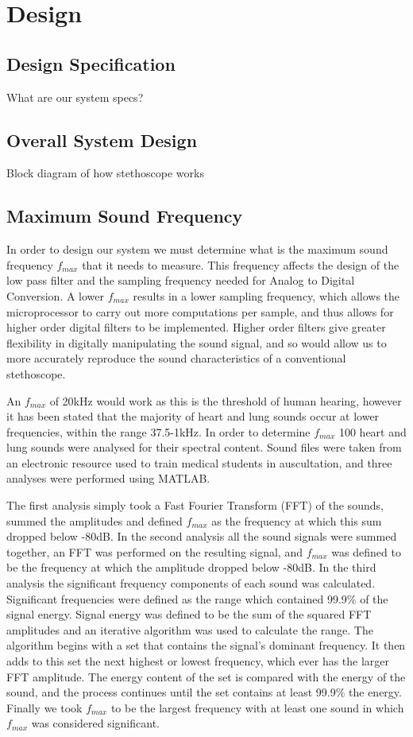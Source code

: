 \chapter{Design} \label{design}

\section{Design Specification}
What are our system specs?

\section{Overall System Design}
Block diagram of how stethoscope works

\section{Maximum Sound Frequency}
In order to design our system we must determine what is the maximum sound frequency $f_{max}$ that it needs to measure. This frequency affects the design of the low pass filter and the sampling frequency needed for Analog to Digital Conversion. A lower $f_{max}$ results in a lower sampling frequency, which allows the microprocessor to carry out more computations per sample, and thus allows for higher order digital filters to be implemented. Higher order filters give greater flexibility in digitally manipulating the sound signal, and so would allow us to more accurately reproduce the sound characteristics of a conventional stethoscope.

An $f_{max}$ of 20kHz would work as this is the threshold of human hearing\cite[p.~163]{Stuart2011}, however it has been stated that the majority of heart and lung sounds occur at lower frequencies, within the range 37.5-1kHz\cite{Abella1992}. In order to determine $f_{max}$ 100 heart and lung sounds were analysed for their spectral content. Sound files were taken from an electronic resource used to train medical students in auscultation\cite{Coviello2014}, and three analyses were performed using MATLAB. 

The first analysis simply took a Fast Fourier Transform (FFT) of the sounds, summed the amplitudes and defined $f_{max}$ as the frequency at which this sum dropped below -80dB. In the second analysis all the sound signals were summed together, an FFT was performed on the resulting signal, and $f_{max}$ was defined to be the frequency at which the amplitude dropped below -80dB. In the third analysis the significant frequency components of each sound was calculated. Significant frequencies were defined as the range which contained 99.9\% of the signal energy. Signal energy was defined to be the sum of the squared FFT amplitudes and an iterative algorithm was used to calculate the range. The algorithm begins with a set that contains the signal's dominant frequency. It then adds to this set the next highest or lowest frequency, which ever has the larger FFT amplitude. The energy content of the set is compared with the energy of the sound, and the process continues until the set contains at least 99.9\% the energy. Finally we took $f_{max}$ to be the largest frequency with at least one sound in which $f_{max}$ was considered significant. 

